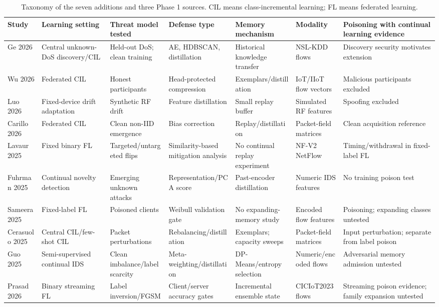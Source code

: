 \documentclass[10pt,a4paper]{article}
\begin{document}
\begin{landscape}
\begin{table}[p]
\centering\footnotesize
\caption{Taxonomy of the seven additions and three Phase 1 sources. CIL means class-incremental learning; FL means federated learning.}
\label{tab:taxonomy}
\begin{tabularx}{\linewidth}{L{2.4cm}Y Y Y Y Y Y}
\toprule
Study & Learning setting & Threat model tested & Defense type & Memory mechanism & Modality & Poisoning with continual learning evidence\\
\midrule
Ge 2026 \cite{ge} & Central unknown-DoS discovery/CIL & Held-out DoS; clean training & AE, HDBSCAN, distillation & Historical knowledge transfer & NSL-KDD flows & Discovery security motivates extension\\
Wu 2026 \cite{wu} & Federated CIL & Honest participants & Head-protected compression & Exemplars/distillation & IoT/IIoT flow vectors & Malicious participants excluded\\
Luo 2026 \cite{luo} & Fixed-device drift adaptation & Synthetic RF drift & Feature distillation & Small replay buffer & Simulated RF features & Spoofing excluded\\
Carillo 2026 \cite{carillo} & Federated CIL & Clean non-IID emergence & Bias correction & Replay/distillation & Packet-field matrices & Clean acquisition reference\\
Lavaur 2025 \cite{lavaur} & Fixed binary FL & Targeted/untargeted flips & Similarity-based mitigation analysis & No continual replay experiment & NF-V2 NetFlow & Timing/withdrawal in fixed-label FL\\
Fuhrman 2025 \cite{cnd} & Continual novelty detection & Emerging unknown attacks & Representation/PCA score & Past-encoder distillation & Numeric IDS features & No training poison test\\
Sameera 2025 \cite{wei} & Fixed-label FL & Poisoned clients & Weibull validation gate & No expanding-memory study & Encoded flow features & Poisoning; expanding classes untested\\
Cerasuolo 2025 \cite{cerasuolo} & Central CIL/few-shot CIL & Packet perturbations & Rebalancing/distillation & Exemplars; capacity sweeps & Packet-field matrices & Input perturbation; separate from label poison\\
Guo 2025 \cite{guo} & Semi-supervised continual IDS & Clean imbalance/label scarcity & Meta-weighting/distillation & DP-Means/entropy selection & Numeric/encoded flows & Adversarial memory admission untested\\
Prasad 2026 \cite{ensemble} & Binary streaming FL & Label inversion/FGSM & Client/server accuracy gates & Incremental ensemble state & CICIoT2023 flows & Streaming poison evidence; family expansion untested\\
\bottomrule
\end{tabularx}
\end{table}
\end{landscape}
\end{document}
